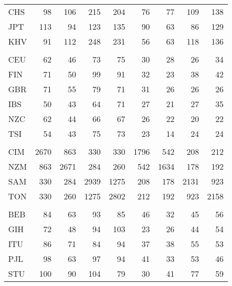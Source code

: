 \documentclass[twoside,openright]{report}
\begin{document}
\begin{table}
\begin{tabular}[t]{lrrrrrrrr}
\hspace{1em}CHS & 98 & 106 & 215 & 204 & 76 & 77 & 109 & 138\\
\hspace{1em}JPT & 113 & 94 & 123 & 135 & 90 & 63 & 86 & 129\\
\hspace{1em}KHV & 91 & 112 & 248 & 231 & 56 & 63 & 118 & 136\\
\addlinespace[0.3em]
\multicolumn{9}{l}{\textbf{EUR}}\\
\hspace{1em}CEU & 62 & 46 & 73 & 75 & 30 & 28 & 26 & 34\\
\hspace{1em}FIN & 71 & 50 & 99 & 91 & 32 & 23 & 38 & 42\\
\hspace{1em}GBR & 71 & 55 & 79 & 71 & 31 & 26 & 26 & 26\\
\hspace{1em}IBS & 50 & 43 & 64 & 71 & 27 & 21 & 27 & 35\\
\hspace{1em}NZC & 62 & 44 & 66 & 67 & 26 & 22 & 20 & 22\\
\hspace{1em}TSI & 54 & 43 & 75 & 73 & 23 & 14 & 24 & 24\\
\addlinespace[0.3em]
\multicolumn{9}{l}{\textbf{POL}}\\
\hspace{1em}CIM & 2670 & 863 & 330 & 330 & 1796 & 542 & 208 & 212\\
\hspace{1em}NZM & 863 & 2671 & 284 & 260 & 542 & 1634 & 178 & 192\\
\hspace{1em}SAM & 330 & 284 & 2939 & 1275 & 208 & 178 & 2131 & 923\\
\hspace{1em}TON & 330 & 260 & 1275 & 2802 & 212 & 192 & 923 & 2158\\
\addlinespace[0.3em]
\multicolumn{9}{l}{\textbf{SAS}}\\
\hspace{1em}BEB & 84 & 63 & 93 & 85 & 46 & 32 & 45 & 56\\
\hspace{1em}GIH & 72 & 48 & 94 & 103 & 23 & 26 & 44 & 54\\
\hspace{1em}ITU & 86 & 71 & 84 & 94 & 37 & 38 & 55 & 53\\
\hspace{1em}PJL & 98 & 63 & 97 & 94 & 41 & 33 & 53 & 46\\
\hspace{1em}STU & 100 & 90 & 104 & 79 & 30 & 41 & 77 & 59\\
\bottomrule
\end{tabular}
\end{table}
\end{document}
